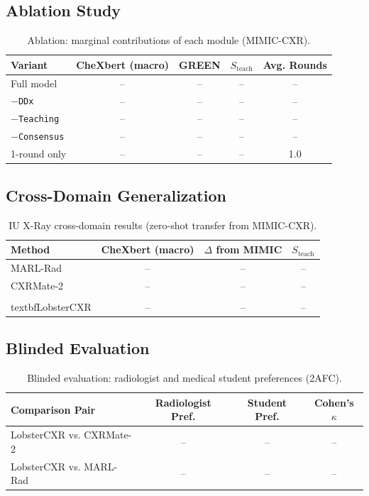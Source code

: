 \documentclass[runningheads,10pt]{llncs}
\newcommand{\Steach}{S_{\text{teach}}}
\begin{document}
\subsection{Ablation Study}

\begin{table}[t]
\centering
\caption{Ablation: marginal contributions of each module (MIMIC-CXR).}
\label{tab:ablation}
\small
\begin{tabular}{lCCCC}
\toprule
Variant & CheXbert (macro) & GREEN & $\Steach$ & Avg. Rounds \\
\midrule
Full model & -- & -- & -- & -- \\
$-$\texttt{DDx} & -- & -- & -- & -- \\
$-$\texttt{Teaching} & -- & -- & -- & -- \\
$-$\texttt{Consensus} & -- & -- & -- & -- \\
1-round only & -- & -- & -- & 1.0 \\
\bottomrule
\end{tabular}
\end{table}

\subsection{Cross-Domain Generalization}

\begin{table}[t]
\centering
\caption{IU X-Ray cross-domain results (zero-shot transfer from MIMIC-CXR).}
\label{tab:cross}
\small
\begin{tabular}{lCCC}
\toprule
Method & CheXbert (macro) & $\Delta$ from MIMIC & $\Steach$ \\
\midrule
MARL-Rad & -- & -- & -- \\
CXRMate-2 & -- & -- & -- \\
\\textbf{LobsterCXR} & -- & -- & -- \\
\bottomrule
\end{tabular}
\end{table}

\subsection{Blinded Evaluation}

\begin{table}[t]
\centering
\caption{Blinded evaluation: radiologist and medical student preferences (2AFC).}
\label{tab:blind}
\small
\begin{tabular}{lCCC}
\toprule
Comparison Pair & Radiologist Pref. & Student Pref. & Cohen's $\kappa$ \\
\midrule
LobsterCXR vs. CXRMate-2 & -- & -- & -- \\
LobsterCXR vs. MARL-Rad & -- & -- & -- \\
\bottomrule
\end{tabular}
\end{table}
\end{document}
